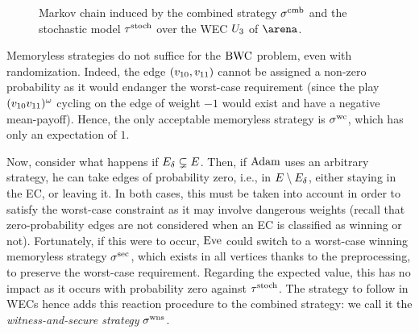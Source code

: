 \begin{example}
\begin{figure}[ht]
  \centering 
      \caption{Markov chain induced by the combined strategy $\sigma^{\text{cmb}}$ and the stochastic model $\tau^{\text{stoch}} $ over the WEC $U_{3}$ of $\arena$.}
\label{13-fig:mp_insideSWEC_MC}
\end{figure}
\end{example}

\begin{remark}
\label{13-rmk:bwcMemorylessNotEnough}
Memoryless strategies do not suffice for the $\text{BWC}$ problem, even with randomization. Indeed, the edge $(v_{10}, v_{11})$ cannot be assigned a non-zero probability as it would endanger the worst-case requirement (since the play~$(v_{10}v_{11})^{\omega}$ cycling on the edge of weight $-1$ would exist and have a negative mean-payoff). Hence, the only acceptable memoryless strategy is $\sigma^{\text{wc}}$, which has only an expectation of $1$.
\end{remark}


Now, consider what happens if $E_{\delta} \subsetneq E$. Then, if $\text{Adam}$ uses an arbitrary strategy, he can take edges of probability zero, i.e., in $E \setminus E_{\delta}$, either staying in the EC, or leaving it. In both cases, this must be taken into account in order to satisfy the worst-case constraint as it may involve dangerous weights (recall that zero-probability edges are not considered when an EC is classified as winning or not). Fortunately, if this were to occur, $\text{Eve}$ could switch to a worst-case winning memoryless strategy $\sigma^{\text{sec}}$, which exists in all vertices thanks to the preprocessing, to preserve the worst-case requirement. Regarding the expected value, this has no impact as it occurs with probability zero against $\tau^{\text{stoch}} $. The strategy to follow in WECs hence adds this reaction procedure to the combined strategy: we call it the \textit{witness-and-secure strategy} $\sigma^{\text{wns}}$.

